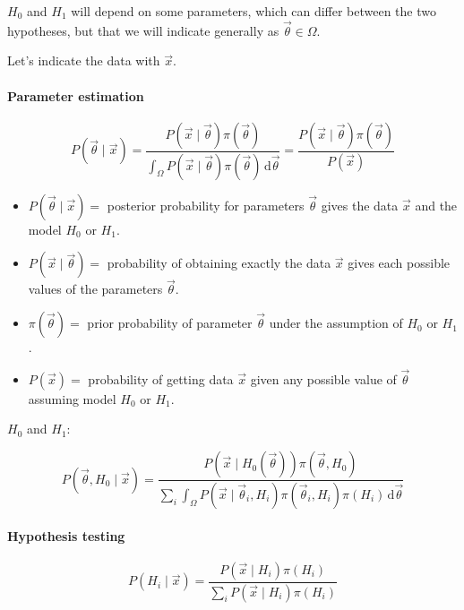 $H_{0}$ and $H_{1}$ will depend on some parameters, which can differ between the two hypotheses, but that we will indicate generally as $\vec{\theta} \in \Omega $.

Let's indicate the data with $\vec{x}$.

\paragraph{Parameter estimation}

\begin{equation}\label{eq:para_esti}
	P( \vec{\theta} \mid \vec{x} )
	= \frac{P( \vec{x} \mid \vec{\theta} ) \pi(\vec{\theta})}
		{\int_{\Omega} {P( \vec{x} \mid \vec{\theta} ) \pi(\vec{\theta})} \,\mathrm{d}\vec{\theta}}
	= \frac{P( \vec{x} \mid \vec{\theta} ) \pi(\vec{\theta})}
		{P( \vec{x})}
\end{equation}

\begin{itemize}
	\item $P( \vec{\theta} \mid \vec{x} ) = $ posterior probability for parameters $\vec{\theta}$ gives the data $\vec{x}$ and the model $H_{0}$ or $H_{1}$. 
	\item $P( \vec{x} \mid \vec{\theta} ) = $ probability of obtaining exactly the data $\vec{x}$ gives each possible values of the parameters $\vec{\theta}$.
	\item $\pi(\vec{\theta}) = $ prior probability of parameter $\vec{\theta}$ under the assumption of $H_{0}$ or $H_{1}$.
	\item $P(\vec{x}) = $ probability of getting data $\vec{x}$ given any possible value of $\vec{\theta}$ assuming model $H_{0}$ or $H_{1}$.
\end{itemize}

 $H_{0}$ and $H_{1}$:

\begin{equation} 
	P( \vec{\theta}, H_{0} \mid \vec{x} )
	= \frac{P( \vec{x} \mid H_{0}(\vec{\theta}) ) \pi( \vec{\theta}, H_{0} )}
		{\sum_{i}{\int_{\Omega} {P( \vec{x} \mid \vec{\theta}_{i}, H_{i} ) \pi( \vec{\theta}_{i}, H_{i} ) \pi(H_{i})} \,\mathrm{d}\vec{\theta}}}
\end{equation} 

\paragraph{Hypothesis testing}
\begin{equation}\label{eq:hypo_test}
	P(H_{i} \mid \vec{x})
	= \frac{P(\vec{x} \mid H_{i}) \pi(H_{i})}
		{\sum_{i}{P(\vec{x} \mid H_{i}) \pi(H_{i})}}
\end{equation}

